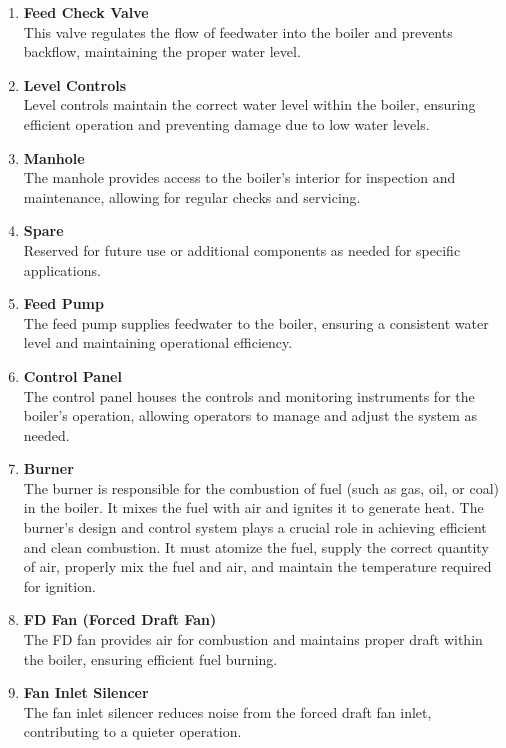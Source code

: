 \begin{enumerate}
    \item \textbf{Feed Check Valve}\\
    This valve regulates the flow of feedwater into the boiler and prevents backflow, maintaining the proper water level.

    \item \textbf{Level Controls \cite{level_control}}\\ 
    Level controls maintain the correct water level within the boiler, ensuring efficient operation and preventing damage due to low water levels.

    \item \textbf{Manhole}\\
    The manhole provides access to the boiler's interior for inspection and maintenance, allowing for regular checks and servicing.

    \item \textbf{Spare}\\
    Reserved for future use or additional components as needed for specific applications.

    \item \textbf{Feed Pump}\\
    The feed pump supplies feedwater to the boiler, ensuring a consistent water level and maintaining operational efficiency.

    \item \textbf{Control Panel}\\
    The control panel houses the controls and monitoring instruments for the boiler's operation, allowing operators to manage and adjust the system as needed.

    \item \textbf{Burner}\\
    The burner is responsible for the combustion of fuel (such as gas, oil, or coal) in the boiler. It mixes the fuel with air and ignites it to generate heat. The burner's design and control system plays a crucial role in achieving efficient and clean combustion. It must atomize the fuel, supply the correct quantity of air, properly mix the fuel and air, and maintain the temperature required for ignition.

    \item \textbf{FD Fan (Forced Draft Fan)}\\
    The FD fan provides air for combustion and maintains proper draft within the boiler, ensuring efficient fuel burning.

    \item \textbf{Fan Inlet Silencer}\\
    The fan inlet silencer reduces noise from the forced draft fan inlet, contributing to a quieter operation.
\end{enumerate}

